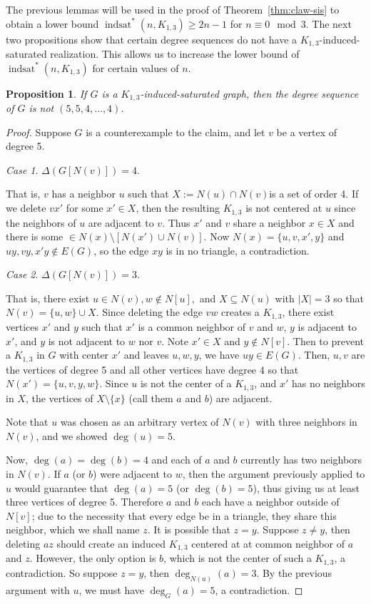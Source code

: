 \documentclass[12pt]{amsart}
\theoremstyle{plain}
\newtheorem{prop}[thm]{Proposition}
\theoremstyle{definition}
\theoremstyle{remark}
\newtheorem{case}{Case}[thm]
\newcommand{\sis}[2]{\ensuremath{{\operatorname{indsat}}^*(#1,#2)}\xspace}
\newcommand{\claw}{\ensuremath{K_{1,3}}\xspace}
\begin{document}
{The previous lemmas will be used in the proof of Theorem~\ref{thm:claw-sis} to obtain a lower bound $\sis{n}{\claw}\geq2n-1$ for $n \equiv 0 \mod 3$.
The next two propositions show that certain degree sequences do not have a \claw-induced-saturated realization.
This allows us to increase the lower bound of $\sis{n}{\claw}$ for certain values of $n$.

\begin{prop}\label{554}If $G$ is a \claw-induced-saturated graph, then the degree sequence of $G$ is not $(5,5,4,\ldots,4)$.
\end{prop}
\begin{proof}
Suppose $G$ is a counterexample to the claim, and let $v$ be a vertex of degree 5.

\begin{case} $\Delta(G[N(v)])=4$.\end{case}
That is, $v$ has a neighbor $u$ such that $X:=N(u)\cap N(v)$is a set of order 4.
If we delete $vx'$ for some $x' \in X$, then the resulting \claw is not centered at $u$ since the neighbors of $u$ are adjacent to $v$.
Thus $x'$ and $v$ share a neighbor $x\in X$ and there is some $\in N(x)\setminus[N(x')\cup N(v)]$.
Now $N(x)=\{u,v,x',y\}$ and $uy,vy,x'y\notin E(G)$, so the edge $xy$ is in no triangle, a contradiction.

\begin{case}\label{Case3} $\Delta(G[N(v)])=3$. \end{case}
That is, there exist $u \in N(v), w\notin N[u],$ and $X\subseteq N(u)$ with $|X|=3$ so that  $N(v)=\{u,w\} \cup X$. Since deleting the edge $vw$ creates a \claw,
there exist vertices $x'$ and $y$ such that $x'$ is a common neighbor of $v$ and $w$, $y$ is adjacent to $x'$, and $y$ is not adjacent to $w$ nor $v$. Note $x' \in X$ and $y \notin N[v]$.
Then to prevent a \claw in $G$ with center $x'$ and leaves $u,w,y$, we have $uy \in E(G)$. Then, $u,v$ are the vertices of degree 5 and all other vertices have degree 4 so that $N(x')=\{u,v,y,w\}$. Since $u$ is not the center of a \claw, and $x'$ has no neighbors in $X$, the vertices of $X\setminus\{x\}$ (call them $a$ and $b$) are adjacent.

Note that $u$ was chosen as an arbitrary vertex of $N(v)$ with three neighbors in $N(v)$, and we showed $\deg(u)=5$.

Now, $\deg(a)=\deg(b)=4$ and each of $a$ and $b$ currently has two neighbors in $N(v)$. If $a$ (or $b$) were adjacent to $w$, then the argument previously applied to $u$ would guarantee that $\deg(a)=5$ (or $\deg(b)=5$), thus giving us at least three vertices of degree 5. Therefore $a$ and $b$ each have a neighbor outside of $N[v]$; due to the necessity that every edge be in a triangle, they share this neighbor, which we shall name $z$.
It is possible that $z=y$.  Suppose $z\neq y$, then deleting $az$ should create an induced \claw centered at at common neighbor of $a$ and $z$.  However, the only option is $b$, which is not the center of such a \claw, a contradiction.  So suppose $z = y$, then $\deg_{N(u)}(a)=3$. By the previous argument with $u$, we must have $\deg_G(a)=5$, a contradiction.


\end{proof}}
\end{document}
